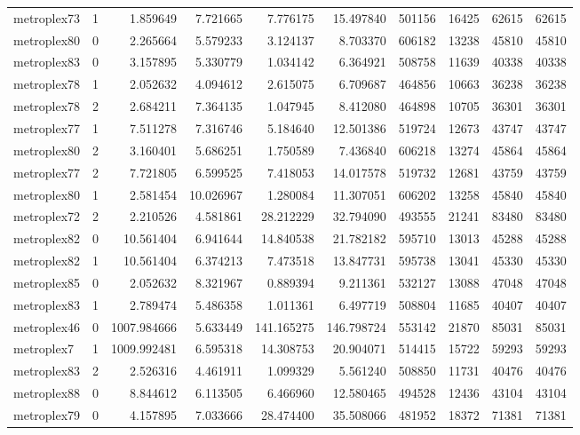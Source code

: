 \begin{longtable}{|l|r|r|r|r|r|r|r|r|r|}
metroplex73 & 1 & 1.859649 & 7.721665 & 7.776175 & 15.497840 & 501156 & 16425 & 62615 & 62615 \\
metroplex80 & 0 & 2.265664 & 5.579233 & 3.124137 & 8.703370 & 606182 & 13238 & 45810 & 45810 \\
metroplex83 & 0 & 3.157895 & 5.330779 & 1.034142 & 6.364921 & 508758 & 11639 & 40338 & 40338 \\
metroplex78 & 1 & 2.052632 & 4.094612 & 2.615075 & 6.709687 & 464856 & 10663 & 36238 & 36238 \\
metroplex78 & 2 & 2.684211 & 7.364135 & 1.047945 & 8.412080 & 464898 & 10705 & 36301 & 36301 \\
metroplex77 & 1 & 7.511278 & 7.316746 & 5.184640 & 12.501386 & 519724 & 12673 & 43747 & 43747 \\
metroplex80 & 2 & 3.160401 & 5.686251 & 1.750589 & 7.436840 & 606218 & 13274 & 45864 & 45864 \\
metroplex77 & 2 & 7.721805 & 6.599525 & 7.418053 & 14.017578 & 519732 & 12681 & 43759 & 43759 \\
metroplex80 & 1 & 2.581454 & 10.026967 & 1.280084 & 11.307051 & 606202 & 13258 & 45840 & 45840 \\
metroplex72 & 2 & 2.210526 & 4.581861 & 28.212229 & 32.794090 & 493555 & 21241 & 83480 & 83480 \\
metroplex82 & 0 & 10.561404 & 6.941644 & 14.840538 & 21.782182 & 595710 & 13013 & 45288 & 45288 \\
metroplex82 & 1 & 10.561404 & 6.374213 & 7.473518 & 13.847731 & 595738 & 13041 & 45330 & 45330 \\
metroplex85 & 0 & 2.052632 & 8.321967 & 0.889394 & 9.211361 & 532127 & 13088 & 47048 & 47048 \\
metroplex83 & 1 & 2.789474 & 5.486358 & 1.011361 & 6.497719 & 508804 & 11685 & 40407 & 40407 \\
metroplex46 & 0 & 1007.984666 & 5.633449 & 141.165275 & 146.798724 & 553142 & 21870 & 85031 & 85031 \\
metroplex7 & 1 & 1009.992481 & 6.595318 & 14.308753 & 20.904071 & 514415 & 15722 & 59293 & 59293 \\
metroplex83 & 2 & 2.526316 & 4.461911 & 1.099329 & 5.561240 & 508850 & 11731 & 40476 & 40476 \\
metroplex88 & 0 & 8.844612 & 6.113505 & 6.466960 & 12.580465 & 494528 & 12436 & 43104 & 43104 \\
metroplex79 & 0 & 4.157895 & 7.033666 & 28.474400 & 35.508066 & 481952 & 18372 & 71381 & 71381 \\

\end{longtable}
